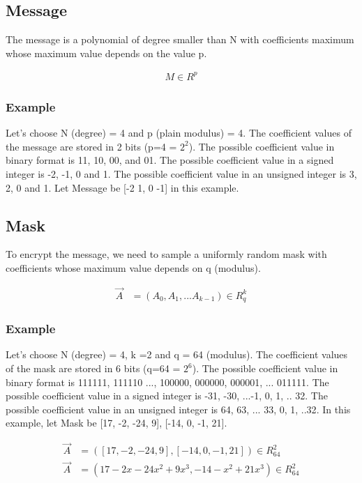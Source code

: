 \documentclass{techrep}
\theoremstyle{definition}
\theoremstyle{plain}
\begin{document}
	\subsection{Message}

The message is a polynomial of degree smaller than N with coefficients maximum whose maximum value depends on the value p.

	\begin{align*}
		M \in R^p
	\end{align*}

\subsubsection{Example}

Let’s choose N (degree) = 4 and p (plain modulus) = 4. The coefficient values of the message are stored in 2 bits (p=4 = $2^2$). The possible coefficient value in binary format is {11, 10, 00, and 01}. The possible coefficient value in a signed integer is {-2, -1, 0 and 1}. The possible coefficient value in an unsigned integer is {3, 2, 0 and 1}. Let Message be [-2 1, 0 -1] in this example.


	\subsection{Mask}
To encrypt the message, we need to sample a uniformly random mask with coefficients whose maximum value depends on q (modulus).

	\begin{align*}
		\overrightarrow{A} &= (A_0,A_1,...A_{k-1}) \in R_q^k
	\end{align*}

\subsubsection{Example}

Let’s choose N (degree) = 4, k =2 and q = 64 (modulus). The coefficient values of the mask are stored in 6 bits (q=64 = $2^6$). The possible coefficient value in binary format is {111111, 111110 ..., 100000, 000000, 000001, ... 011111}. The possible coefficient value in a signed integer is {-31, -30, ...-1, 0, 1, .. 32}. The possible coefficient value in an unsigned integer is {64, 63, ... 33, 0, 1, ..32}. In this example, let Mask be [17, -2, -24, 9], [-14, 0, -1, 21].

\begin{align*} 
\overrightarrow{A} &= ([17, -2, -24, 9], [-14, 0, -1, 21]) \in R_{64}^2 \\ 
\overrightarrow{A} &= (17-2x -24x^2 +9x^3,-14-x^2+21x^3) \in R_{64}^2 \\ 
\end{align*}
\end{document}
